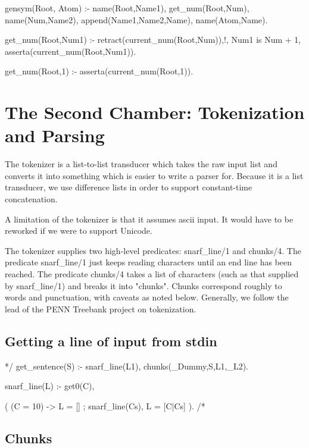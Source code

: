\documentclass{book}[9pt]
\newenvironment{code}%
{\small \verbatim}%
{\endverbatim \large}
\begin{document}
\begin{code}
gensym(Root, Atom) :-
        name(Root,Name1),
        get_num(Root,Num),
        name(Num,Name2),
        append(Name1,Name2,Name),
        name(Atom,Name).

get_num(Root,Num1) :-
        retract(current_num(Root,Num)),!,
        Num1 is Num + 1,
        asserta(current_num(Root,Num1)).

get_num(Root,1) :- asserta(current_num(Root,1)).
\end{code}

    
\chapter{The Second Chamber: Tokenization and Parsing}

The tokenizer is a list-to-list transducer which takes the raw input
list and converts it into something which is easier to write a parser
for.  Because it is a list transducer, we use difference lists in
order to support constant-time concatenation.

A limitation of the tokenizer is that it assumes ascii input.  It
would have to be reworked if we were to support Unicode.

The tokenizer supplies two high-level predicates: snarf\_line/1 and
chunks/4.  The predicate snarf\_line/1 just keeps reading characters
until an end line has been reached.  The predicate chunks/4 takes a
list of characters (such as that supplied by snarf\_line/1) and breaks
it into "chunks".  Chunks correspond roughly to words and punctuation,
with caveats as noted below.  Generally, we follow the lead of the
PENN Treebank project \cite{marcus93} on tokenization.

\section{Getting a line of input from stdin}

\begin{code}
*/
get_sentence(S) :-
        snarf_line(L1),
        chunks(_Dummy,S,L1,_L2).

snarf_line(L) :-
        get0(C),
        
        ( (C = 10) ->
            L = []
        ;
            snarf_line(Cs),
            L = [C|Cs]
        ).
/*
\end{code}

\section{Chunks}
\end{document}
